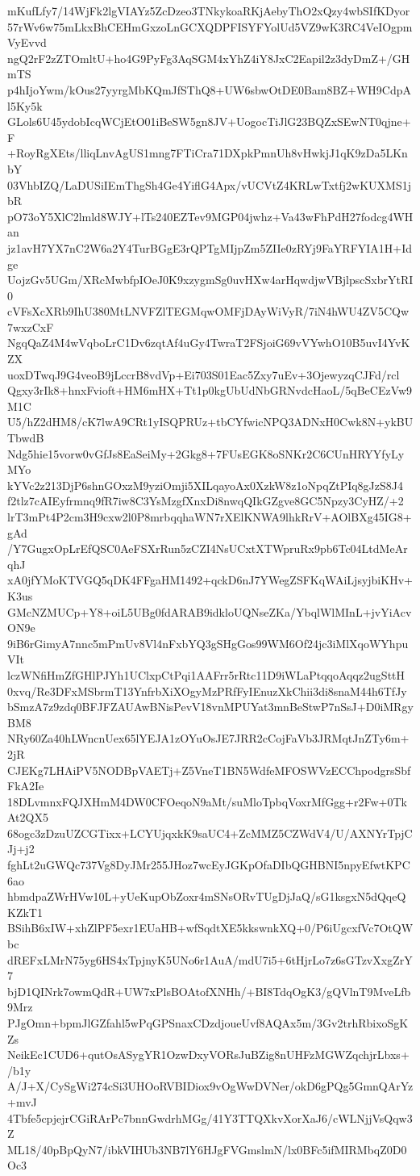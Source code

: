 mKufLfy7/14WjFk2lgVIAYz5ZcDzeo3TNkykoaRKjAebyThO2xQzy4wbSIfKDyor
57rWv6w75mLkxBhCEHmGxzoLnGCXQDPFISYFYolUd5VZ9wK3RC4VeIOgpmVyEvvd
ngQ2rF2zZTOmltU+ho4G9PyFg3AqSGM4xYhZ4iY8JxC2Eapil2z3dyDmZ+/GHmTS
p4hIjoYwm/kOus27yyrgMbKQmJfSThQ8+UW6sbwOtDE0Bam8BZ+WH9CdpAl5Ky5k
GLols6U45ydobIcqWCjEtO01iBeSW5gn8JV+UogocTiJlG23BQZxSEwNT0qjne+F
+RoyRgXEts/lliqLnvAgUS1mng7FTiCra71DXpkPmnUh8vHwkjJ1qK9zDa5LKnbY
03VhbIZQ/LaDUSiIEmThgSh4Ge4YiflG4Apx/vUCVtZ4KRLwTxtfj2wKUXMS1jbR
pO73oY5XlC2lmld8WJY+lTs240EZTev9MGP04jwhz+Va43wFhPdH27fodcg4WHan
jz1avH7YX7nC2W6a2Y4TurBGgE3rQPTgMIjpZm5ZIIe0zRYj9FaYRFYIA1H+Idge
UojzGv5UGm/XRcMwbfpIOeJ0K9xzygmSg0uvHXw4arHqwdjwVBjlpscSxbrYtRI0
cVFsXcXRb9IhU380MtLNVFZlTEGMqwOMFjDAyWiVyR/7iN4hWU4ZV5CQw7wxzCxF
NgqQaZ4M4wVqboLrC1Dv6zqtAf4uGy4TwraT2FSjoiG69vVYwhO10B5uvI4YvKZX
uoxDTwqJ9G4veoB9jLccrB8vdVp+Ei703S01Eac5Zxy7uEv+3OjewyzqCJFd/rcl
Qgxy3rIk8+hnxFvioft+HM6mHX+Tt1p0kgUbUdNbGRNvdcHaoL/5qBeCEzVw9M1C
U5/hZ2dHM8/cK7lwA9CRt1yISQPRUz+tbCYfwicNPQ3ADNxH0Cwk8N+ykBUTbwdB
Ndg5hie15vorw0vGfJs8EaSeiMy+2Gkg8+7FUsEGK8oSNKr2C6CUnHRYYfyLyMYo
kYVc2z213DjP6shnGOxzM9yziOmji5XILqayoAx0XzkW8z1oNpqZtPIq8gJzS8J4
f2tlz7cAIEyfrmnq9fR7iw8C3YsMzgfXnxDi8nwqQIkGZgve8GC5Npzy3CyHZ/+2
lrT3mPt4P2cm3H9cxw2l0P8mrbqqhaWN7rXElKNWA9lhkRrV+AOlBXg45IG8+gAd
/Y7GugxOpLrEfQSC0AeFSXrRun5zCZI4NsUCxtXTWpruRx9pb6Tc04LtdMeArqhJ
xA0jfYMoKTVGQ5qDK4FFgaHM1492+qckD6nJ7YWegZSFKqWAiLjsyjbiKHv+K3us
GMcNZMUCp+Y8+oiL5UBg0fdARAB9idkloUQNseZKa/YbqlWlMInL+jvYiAcvON9e
9iB6rGimyA7nnc5mPmUv8Vl4nFxbYQ3gSHgGos99WM6Of24jc3iMlXqoWYhpuVIt
lczWNfiHmZfGHlPJYh1UClxpCtPqi1AAFrr5rRtc11D9iWLaPtqqoAqqz2ugSttH
0xvq/Re3DFxMSbrmT13YnfrbXiXOgyMzPRfFyIEnuzXkChii3di8snaM44h6TfJy
bSmzA7z9zdq0BFJFZAUAwBNisPevV18vnMPUYat3mnBeStwP7nSsJ+D0iMRgyBM8
NRy60Za40hLWncnUex65lYEJA1zOYuOsJE7JRR2cCojFaVb3JRMqtJnZTy6m+2jR
CJEKg7LHAiPV5NODBpVAETj+Z5VneT1BN5WdfeMFOSWVzECChpodgrsSbfFkA2Ie
18DLvmnxFQJXHmM4DW0CFOeqoN9aMt/suMloTpbqVoxrMfGgg+r2Fw+0TkAt2QX5
68ogc3zDzuUZCGTixx+LCYUjqxkK9saUC4+ZcMMZ5CZWdV4/U/AXNYrTpjCJj+j2
fghLt2uGWQc737Vg8DyJMr255JHoz7wcEyJGKpOfaDIbQGHBNI5npyEfwtKPC6ao
hbmdpaZWrHVw10L+yUeKupObZoxr4mSNsORvTUgDjJaQ/sG1ksgxN5dQqeQKZkT1
BSihB6xIW+xhZlPF5exr1EUaHB+wfSqdtXE5kkswnkXQ+0/P6iUgcxfVc7OtQWbc
dREFxLMrN75yg6HS4xTpjnyK5UNo6r1AuA/mdU7i5+6tHjrLo7z6sGTzvXxgZrY7
bjD1QINrk7owmQdR+UW7xPlsBOAtofXNHh/+BI8TdqOgK3/gQVlnT9MveLfb9Mrz
PJgOmn+bpmJlGZfahl5wPqGPSnaxCDzdjoueUvf8AQAx5m/3Gv2trhRbixoSgKZs
NeikEc1CUD6+qutOsASygYR1OzwDxyVORsJuBZig8nUHFzMGWZqchjrLbxs+/b1y
A/J+X/CySgWi274cSi3UHOoRVBIDiox9vOgWwDVNer/okD6gPQg5GmnQArYz+mvJ
4Tbfe5cpjejrCGiRArPc7bnnGwdrhMGg/41Y3TTQXkvXorXaJ6/cWLNjjVsQqw3Z
ML18/40pBpQyN7/ibkVIHUb3NB7lY6HJgFVGmslmN/lx0BFc5ifMIRMbqZ0D0Oc3
